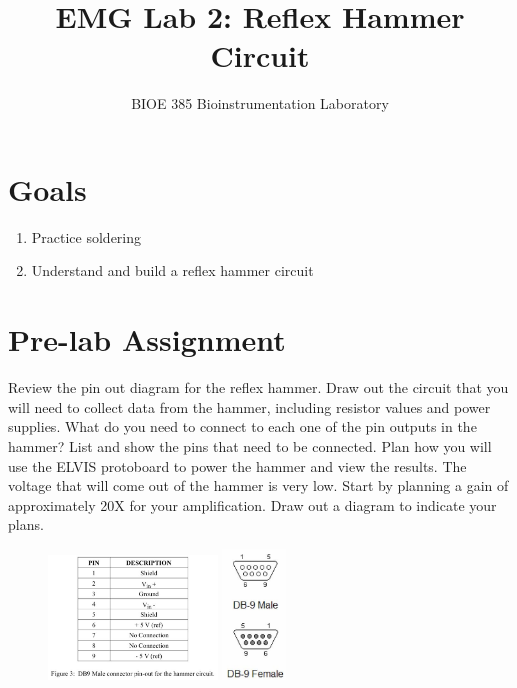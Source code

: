 \documentclass{article}
\title{EMG Lab 2: Reflex Hammer Circuit}
\author{BIOE 385 Bioinstrumentation Laboratory}
\date{}
\begin{document}
\large
\maketitle

\section*{Goals}
\begin{enumerate}
	\item Practice soldering
	\item Understand and build a reflex hammer circuit
\end{enumerate}

\section*{Pre-lab Assignment}
Review the pin out diagram for the reflex hammer. Draw out the circuit that you will need to collect data from the hammer, including resistor values and power supplies. What do you need to connect to each one of the pin outputs in the hammer? List and show the pins that need to be connected. Plan how you will use the ELVIS protoboard to power the hammer and view the results. The voltage that will come out of the hammer is very low. Start by planning a gain of approximately 20X for your amplification. Draw out a diagram to indicate your plans.

\begin{figure}[h]
    	\includegraphics[width=0.4\textwidth]{lab_2_fig_1.jpg}
    	\includegraphics[width=0.15\textwidth]{lab_2_fig_2.jpg}
    	\centering
		\end{figure}
\end{document}
